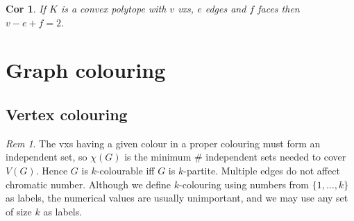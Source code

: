 \documentclass[11pt, fleqn, a4paper, landscape]{article}
\theoremstyle{plain} %
\newtheorem{cor}[thm]{Cor}
\theoremstyle{remark} %
\newtheorem{rem}[thm]{Rem}
\theoremstyle{definition} %
\newtheorem{defi}[thm]{Def}
\begin{document}
\begin{multicols}{5}
\addtocounter{thm}{2}
\addtocounter{thm}{1}

\begin{cor}
If $K$ is a convex polytope with $v$ vxs, $e$ edges and $f$ faces then $v - e + f = 2$.
\end{cor}

\section{Graph colouring}
\subsection{Vertex colouring}

%
\addtocounter{thm}{2}
\begin{rem}
The vxs having a given colour in a proper colouring must form an independent set, so $\chi(G)$ is the minimum \# independent sets needed to cover $V (G).$ Hence $G$ is $k$-colourable iff $G$ is $k$-partite. Multiple edges do not affect chromatic number. Although we define
$k$-colouring using numbers from $\{1, \dots , k\}$ as labels, the numerical values are usually unimportant, and we may use any set of size $k$ as labels.
\end{rem}


\end{multicols}
\end{document}
